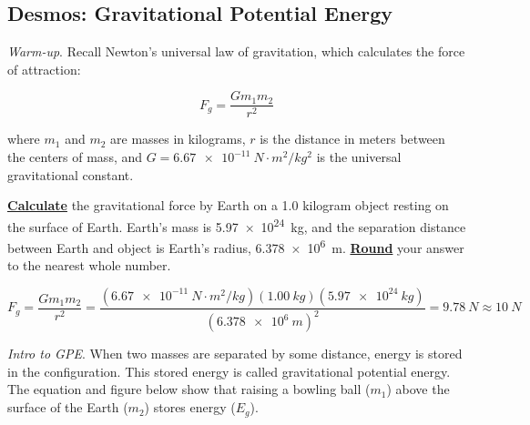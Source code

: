 \documentclass[]{exam}
\begin{document}


\subsection*{Desmos: Gravitational Potential Energy}

\begin{questions}
\question
\textit{Warm-up}. Recall Newton's universal law of gravitation, which calculates the force of attraction:

\begin{equation*}
    F_g = \frac{G m_1 m_2}{r^2}
\end{equation*}

where $m_1$ and $m_2$ are masses in kilograms, $r$ is the distance in meters between the centers of mass, and $G = \SI{6.67e-11}{N\cdot m^2/kg^2}$ is the universal gravitational constant.

\textbf{\underline{Calculate}} the gravitational force by Earth on a 1.0 kilogram object resting on the surface of Earth. Earth's mass is \SI{5.97e24}{kg}, and the separation distance between Earth and object is Earth's radius, \SI{6.378e6}{m}. \textbf{\underline{Round}} your answer to the nearest whole number.

\begin{solutionorbox}[1.5cm]

\begin{equation*}
    F_g = \frac{G m_1 m_2}{r^2} = \frac{(\SI{6.67e-11}{N\cdot m^2/kg})(\SI{1.00}{kg})(\SI{5.97e24}{kg})}{(\SI{6.378e6}{m})^2} = \SI{9.78}{N} \approx \boxed{\SI{10}{N}}
\end{equation*}
\end{solutionorbox}

\question
\textit{Intro to GPE}. When two masses are separated by some distance, energy is stored in the configuration. This stored energy is called gravitational potential energy. The equation and figure below show that raising a bowling ball ($m_1$) above the surface of the Earth ($m_2$) stores energy ($E_g$).

\bigskip


\end{questions}
\end{document}
